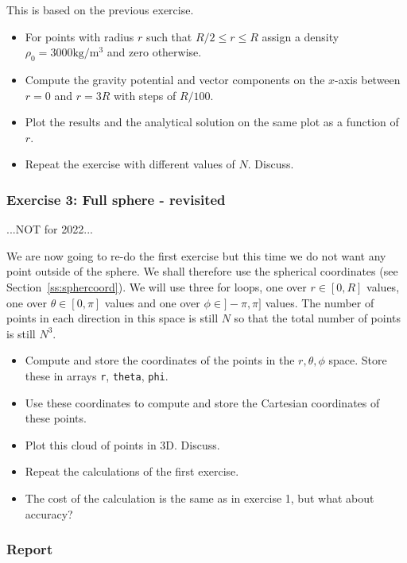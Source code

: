 This is based on the previous exercise. 
\begin{itemize}
\item For points with radius $r$ such that $R/2 \le r \le R$ assign a density $\rho_0=3000\si{\kilo\gram\per\cubic\metre}$ 
and zero otherwise.
\item Compute the gravity potential and vector components on the $x$-axis between $r=0$ and $r=3R$ 
with steps of $R/100$.
\item Plot the results and the analytical solution on the same plot as a function of $r$.
\item Repeat the exercise with different values of $N$. Discuss.
\end{itemize}




\subsubsection*{Exercise 3: Full sphere - revisited}

...NOT for 2022...

We are now going to re-do the first exercise but this time we do not want any point outside of the sphere. 
We shall therefore use the spherical coordinates (see Section~\ref{ss:sphercoord}).
We will use three for loops, one over $r\in[0,R]$ values, 
one over $\theta\in[0,\pi]$ values and one over $\phi\in]-\pi,\pi]$ values. The number 
of points in each direction in this space is still $N$ so that the total number of points is
still $N^3$.

\begin{itemize}
\item Compute and store the coordinates of the points in the $r,\theta,\phi$ space. Store 
these in arrays {\tt r}, {\tt theta}, {\tt phi}.
\item Use these coordinates to compute and store the Cartesian coordinates of these points. 
\item Plot this cloud of points in 3D. Discuss.
\item Repeat the calculations of the first exercise.
\item The cost of the calculation is the same as in exercise 1, but what about accuracy?
\end{itemize}


\subsubsection*{Report}

